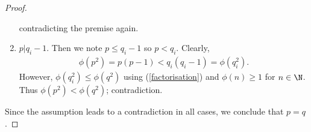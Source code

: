 \documentclass{article}
\begin{document}
\begin{claim*}[1]
\begin{proof}
\begin{enumerate}
               contradicting the premise again.
         \item $p|q_i-1$. Then we note $p\leq q_i-1$ so $p<q_i$.  Clearly,
               \begin{align*}
                  \phi\left(p^2\right)=p(p-1)<q_i(q_i-1)=\phi\left(q_i^2\right).
               \end{align*}
               However, $\phi\left(q_i^2\right)\leq \phi\left(q^2\right)$ using
               (\ref{factorisation}) and $\phi(n)\geq 1$ for $n\in\N$. Thus
               $\phi\left(p^2\right)<\phi\left(q^2\right)$; contradiction.
      \end{enumerate}
      Since the assumption leads to a contradiction in all cases, we conclude
      that $p=q$.
   \end{proof}
\end{claim*}
\end{document}
